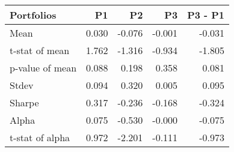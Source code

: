 \begin{tabular}{lrrrr}
\toprule
Portfolios & P1 & P2 & P3 & P3 - P1 \\
\midrule
Mean & 0.030 & -0.076 & -0.001 & -0.031 \\
t-stat of mean & 1.762 & -1.316 & -0.934 & -1.805 \\
p-value of mean & 0.088 & 0.198 & 0.358 & 0.081 \\
Stdev & 0.094 & 0.320 & 0.005 & 0.095 \\
Sharpe & 0.317 & -0.236 & -0.168 & -0.324 \\
Alpha & 0.075 & -0.530 & -0.000 & -0.075 \\
t-stat of alpha & 0.972 & -2.201 & -0.111 & -0.973 \\
\bottomrule
\end{tabular}
